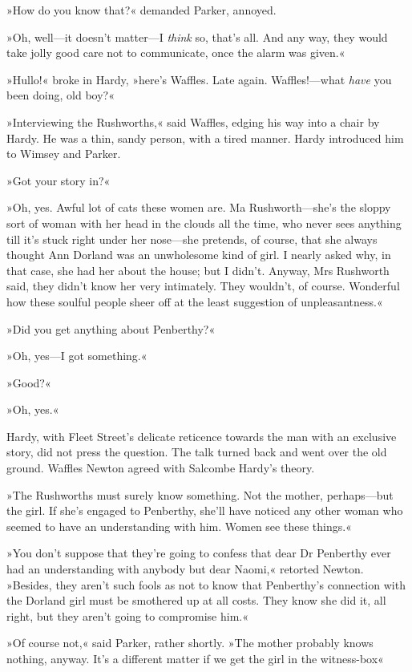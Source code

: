 »How do you know that?« demanded Parker, annoyed.

»Oh, well—it doesn't matter—I \textit{think} so, that's all. And any way, they would take jolly good care not to communicate, once the alarm was given.«

»Hullo!« broke in Hardy, »here's Waffles. Late again. Waffles!—what \textit{have} you been doing, old boy?«

»Interviewing the Rushworths,« said Waffles, edging his way into a chair by Hardy. He was a thin, sandy person, with a tired manner. Hardy introduced him to Wimsey and Parker.

»Got your story in?«

»Oh, yes. Awful lot of cats these women are. Ma Rushworth—she's the sloppy sort of woman with her head in the clouds all the time, who never sees anything till it's stuck right under her nose—she pretends, of course, that she always thought Ann Dorland was an unwholesome kind of girl. I nearly asked why, in that case, she had her about the house; but I didn't. Anyway, Mrs Rushworth said, they didn't know her very intimately. They wouldn't, of course. Wonderful how these soulful people sheer off at the least suggestion of unpleasantness.«

»Did you get anything about Penberthy?«

»Oh, yes—I got something.«

»Good?«

»Oh, yes.«

Hardy, with Fleet Street's delicate reticence towards the man with an exclusive story, did not press the question. The talk turned back and went over the old ground. Waffles Newton agreed with Salcombe Hardy's theory.

»The Rushworths must surely know something. Not the mother, perhaps—but the girl. If she's engaged to Penberthy, she'll have noticed any other woman who seemed to have an understanding with him. Women see these things.«

»You don't suppose that they're going to confess that dear Dr Penberthy ever had an understanding with anybody but dear Naomi,« retorted Newton. »Besides, they aren't such fools as not to know that Penberthy's connection with the Dorland girl must be smothered up at all costs. They know she did it, all right, but they aren't going to compromise him.«

»Of course not,« said Parker, rather shortly. »The mother probably knows nothing, anyway. It's a different matter if we get the girl in the witness-box\longdash«

